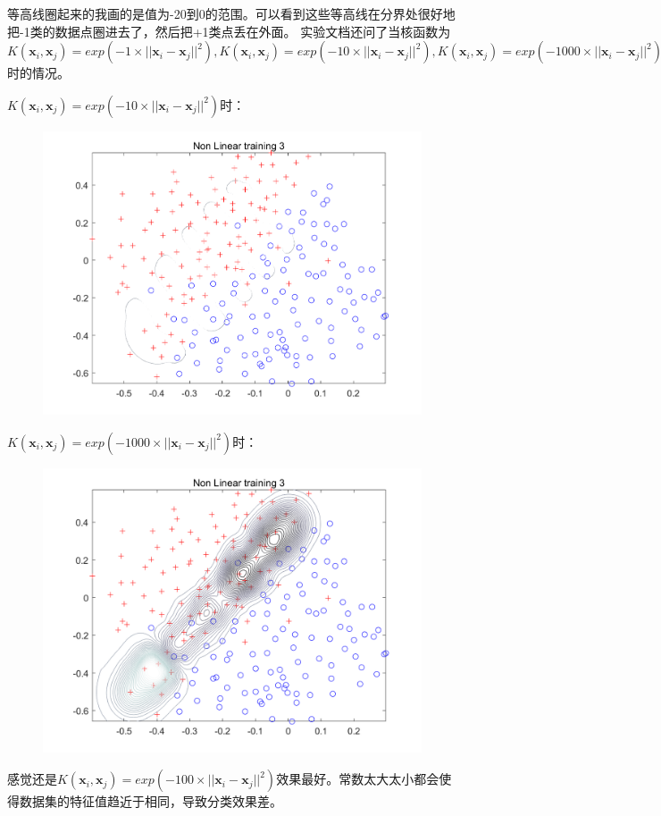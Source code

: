 \documentclass{article}
\begin{document}
等高线圈起来的我画的是值为-20到0的范围。可以看到这些等高线在分界处很好地把-1类的数据点圈进去了，然后把+1类点丢在外面。
实验文档还问了当核函数为$K(\textbf{x}_i,\textbf{x}_j)=exp(-1\times||\textbf{x}_i-\textbf{x}_j||^2), K(\textbf{x}_i,\textbf{x}_j)=exp(-10\times||\textbf{x}_i-\textbf{x}_j||^2),K(\textbf{x}_i,\textbf{x}_j)=exp(-1000\times||\textbf{x}_i-\textbf{x}_j||^2)$时的情况。

$K(\textbf{x}_i,\textbf{x}_j)=exp(-10\times||\textbf{x}_i-\textbf{x}_j||^2)$时：
\begin{figure}[H]
	\centering
	\includegraphics[width=0.6\linewidth]{9.png}
\end{figure}
$K(\textbf{x}_i,\textbf{x}_j)=exp(-1000\times||\textbf{x}_i-\textbf{x}_j||^2)$时：
\begin{figure}[H]
	\centering
	\includegraphics[width=0.6\linewidth]{8.png}
\end{figure}

感觉还是$K(\textbf{x}_i,\textbf{x}_j)=exp(-100\times||\textbf{x}_i-\textbf{x}_j||^2)$效果最好。常数太大太小都会使得数据集的特征值趋近于相同，导致分类效果差。
\end{document}
